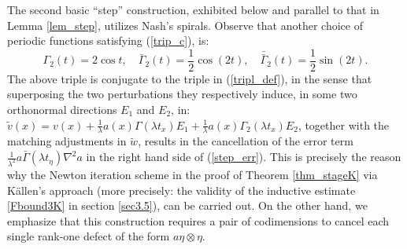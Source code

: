 \documentclass[reqno,twoside,11pt]{amsart}
\newcommand*{\dbar}[1]{\bar{\bar{#1}}}
\numberwithin{equation}{section}
\theoremstyle{plain}
\theoremstyle{definition}
\begin{document}
\noindent The second basic ``step'' construction, exhibited below and parallel to that in
Lemma \ref{lem_step}, utilizes Nash's spirals. Observe that another choice
of periodic functions satisfying (\ref{trip_c}), is:
$$\Gamma_2(t) = 2\cos t,\quad \bar\Gamma_2(t) = \frac{1}{2}\cos (2t), \quad
\dbar\Gamma_2(t) = \frac{1}{2}\sin (2t).$$ 
The above triple is conjugate to the triple in  (\ref{tripl_def}), in
the sense that superposing the two perturbations they respectively induce, in some two orthonormal 
directions $E_1$ and $E_2$, in: $\tilde v(x) = v(x) +
\frac{1}{\lambda}a(x)\Gamma(\lambda t_x)E_1 +
\frac{1}{\lambda}a(x)\Gamma_2(\lambda t_x)E_2$, together with the matching
adjustments in $\tilde w$, results in the cancellation of the error term
$\frac{1}{\lambda^2}a\bar\Gamma(\lambda t_\eta)\nabla^2a$ in the right
hand side of (\ref{step_err}). This is precisely the
reason why the Newton iteration scheme in the proof of Theorem \ref{thm_stageK} via
K\"allen's approach (more precisely: the
validity of the inductive estimate \ref{Fbound3K} in section \ref{sec3.5}), can be carried out. On the other
hand, we emphasize that this construction requires a pair of
codimensions to cancel each single rank-one defect of the form
$a\eta\otimes \eta$. 
\end{document}
